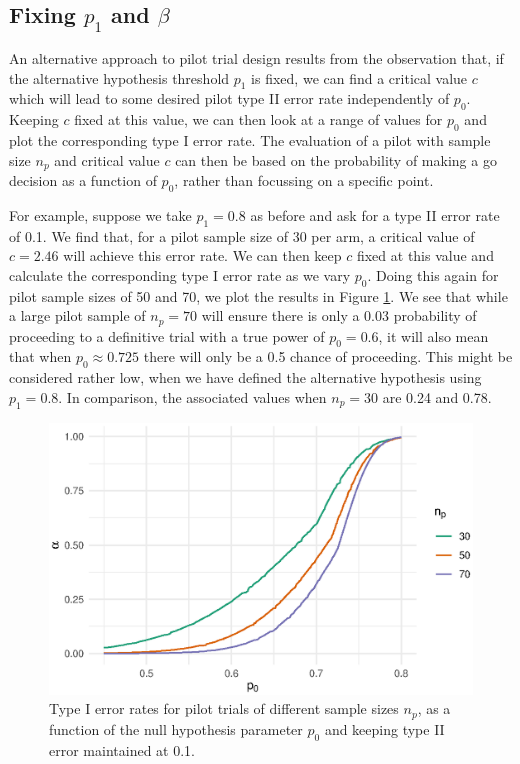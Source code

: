 \documentclass{article}
\begin{document}
\subsection{Fixing $p_1$ and $\beta$}

An alternative approach to pilot trial design results from the observation that, if the alternative hypothesis threshold $p_1$ is fixed, we can find a critical value $c$ which will lead to some desired pilot type II error rate independently of $p_0$. Keeping $c$ fixed at this value, we can then look at a range of values for $p_0$ and plot the corresponding type I error rate. The evaluation of a pilot with sample size $n_p$ and critical value $c$ can then be based on the probability of making a go decision as a function of $p_0$, rather than focussing on a specific point.

For example, suppose we take $p_1 = 0.8$ as before and ask for a type II error rate of 0.1. We find that, for a pilot sample size of 30 per arm, a critical value of  $c = 2.46$ will achieve this error rate. We can then keep $c$ fixed at this value and calculate the corresponding type I error rate as we vary $p_0$. Doing this again for pilot sample sizes of 50 and 70, we plot the results in Figure \ref{fig:alt}. We see that while a large pilot sample of $n_p = 70$ will ensure there is only a 0.03 probability of proceeding to a definitive trial with a true power of $p_0 = 0.6$, it will also mean that when $p_0 \approx 0.725$ there will only be a 0.5 chance of proceeding. This might be considered rather low, when we have defined the alternative hypothesis using $p_1 = 0.8$. In comparison, the associated values when $n_p = 30$ are 0.24 and 0.78.

\begin{figure}
\centering
\includegraphics[scale=0.8]{alt}
\caption{Type I error rates for pilot trials of different sample sizes $n_p$, as a function of the null hypothesis parameter $p_0$ and keeping type II error maintained at 0.1.}
\label{fig:alt}
\end{figure}
\end{document}
